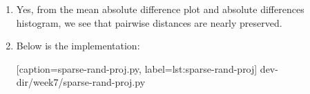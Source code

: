 \documentclass{article}
\begin{document}
\begin{enumerate}[leftmargin={*}, font={\bf}, label={\arabic*.}, ref={\arabic*}]
\begin{enumerate}[label={(\Alph*)}, ref={\theenumi(\Alph*)}]
\begin{enumerate}[label={(\roman*)}, ref={\theenumii(\roman*)}]
          \item
            Yes, from the mean absolute difference plot and absolute differences histogram,
            we see that pairwise distances are nearly preserved.
            
          \item
            Below is the implementation:
            
              [caption={\sf sparse-rand-proj.py}, label={lst:sparse-rand-proj}]
              {dev-dir/week7/sparse-rand-proj.py}
        \end{enumerate}
    \end{enumerate}
\end{enumerate}
\end{document}
